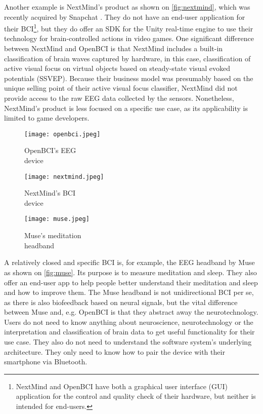 Another example is NextMind's product as shown on \autoref{fig:nextmind}, which was recently acquired by Snapchat \citep{heater_snap_2022}. They do not have an end-user application for their BCI\footnote{NextMind and OpenBCI have both a graphical user interface (GUI) application for the control and quality check of their hardware, but neither is intended for end-users.}, but they do offer an SDK for the Unity real-time engine to use their technology for brain-controlled actions in video games. One significant difference between NextMind and OpenBCI is that NextMind includes a built-in classification of brain waves captured by hardware, in this case, classification of active visual focus on virtual objects based on steady-state visual evoked potentials (SSVEP). Because their business model was presumably based on the unique selling point of their active visual focus classifier, NextMind did not provide access to the raw EEG data collected by the sensors. Nonetheless, NextMind's product is less focused on a specific use case, as its applicability is limited to game developers.

\begin{figure}[!htb]
  \texttt{[image: openbci.jpeg]}
  \caption{OpenBCI's EEG \\ device \citep{be_superhvman_conor_2017}}
  \label{fig:openbci}
  \endminipage\hfill
  \texttt{[image: nextmind.jpeg]}
  \caption{NextMind's BCI \\ device \citep{louise_neurotechnology_2019}}
  \label{fig:nextmind}
  \endminipage\hfill
  \texttt{[image: muse.jpeg]}
  \caption{Muse's meditation \\ headband \citep{muse_muse_nodate}}
  \label{fig:muse}
  \endminipage
\end{figure}

A relatively closed and specific BCI is, for example, the EEG headband by Muse as shown on \autoref{fig:muse}. Its purpose is to measure meditation and sleep. They also offer an end-user app to help people better understand their meditation and sleep and how to improve them. The Muse headband is not unidirectional BCI per se, as there is also biofeedback based on neural signals, but the vital difference between Muse and, e.g. OpenBCI is that they abstract away the neurotechnology. Users do not need to know anything about neuroscience, neurotechnology or the interpretation and classification of brain data to get useful functionality for their use case. They also do not need to understand the software system's underlying architecture. They only need to know how to pair the device with their smartphone via Bluetooth.

